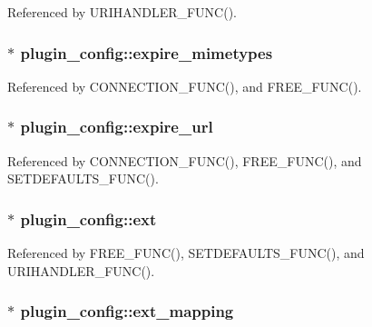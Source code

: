 Referenced by U\-R\-I\-H\-A\-N\-D\-L\-E\-R\-\_\-\-F\-U\-N\-C().

\hypertarget{structplugin__config_a12c31c882ac5dec68e94c7e6926c9587}{
\subsubsection[{expire\-\_\-mimetypes}]{$\ast$ plugin\-\_\-config\-::expire\-\_\-mimetypes}}\label{structplugin__config_a12c31c882ac5dec68e94c7e6926c9587}


Referenced by C\-O\-N\-N\-E\-C\-T\-I\-O\-N\-\_\-\-F\-U\-N\-C(), and F\-R\-E\-E\-\_\-\-F\-U\-N\-C().

\hypertarget{structplugin__config_a22279a8ba759ef86b05dfe068e312f02}{
\subsubsection[{expire\-\_\-url}]{$\ast$ plugin\-\_\-config\-::expire\-\_\-url}}\label{structplugin__config_a22279a8ba759ef86b05dfe068e312f02}


Referenced by C\-O\-N\-N\-E\-C\-T\-I\-O\-N\-\_\-\-F\-U\-N\-C(), F\-R\-E\-E\-\_\-\-F\-U\-N\-C(), and S\-E\-T\-D\-E\-F\-A\-U\-L\-T\-S\-\_\-\-F\-U\-N\-C().

\hypertarget{structplugin__config_af4c96ae345ae4050dced2f94cb53d377}{
\subsubsection[{ext}]{$\ast$ plugin\-\_\-config\-::ext}}\label{structplugin__config_af4c96ae345ae4050dced2f94cb53d377}


Referenced by F\-R\-E\-E\-\_\-\-F\-U\-N\-C(), S\-E\-T\-D\-E\-F\-A\-U\-L\-T\-S\-\_\-\-F\-U\-N\-C(), and U\-R\-I\-H\-A\-N\-D\-L\-E\-R\-\_\-\-F\-U\-N\-C().

\hypertarget{structplugin__config_ad3c2a58d1ab82ff2773215157bbbad9b}{
\subsubsection[{ext\-\_\-mapping}]{$\ast$ plugin\-\_\-config\-::ext\-\_\-mapping}}\label{structplugin__config_ad3c2a58d1ab82ff2773215157bbbad9b}


